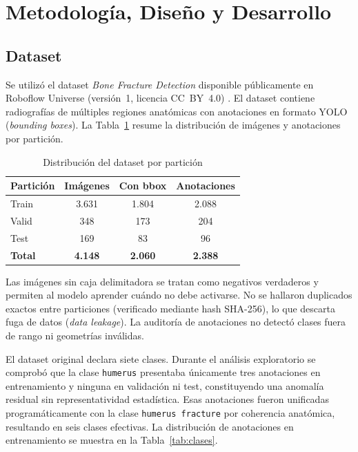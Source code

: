 \documentclass[conference]{IEEEtran}
\begin{document}
\section{Metodología, Diseño y Desarrollo}

\subsection{Dataset}

Se utilizó el dataset \textit{Bone Fracture Detection} disponible públicamente en
Roboflow Universe (versión~1, licencia CC~BY~4.0) \cite{b5}. El dataset contiene
radiografías de múltiples regiones anatómicas con anotaciones en formato YOLO
(\textit{bounding boxes}). La Tabla~\ref{tab:dataset} resume la distribución de
imágenes y anotaciones por partición.

\begin{table}[htbp]
\caption{Distribución del dataset por partición}
\label{tab:dataset}
\begin{center}
\begin{tabular}{lccc}
\toprule
\textbf{Partición} & \textbf{Imágenes} & \textbf{Con bbox} & \textbf{Anotaciones} \\
\midrule
Train & 3.631 & 1.804 & 2.088 \\
Valid & 348   & 173   & 204   \\
Test  & 169   & 83    & 96    \\
\midrule
\textbf{Total} & \textbf{4.148} & \textbf{2.060} & \textbf{2.388} \\
\bottomrule
\end{tabular}
\end{center}
\end{table}

Las imágenes sin caja delimitadora se tratan como negativos verdaderos y permiten
al modelo aprender cuándo no debe activarse. No se hallaron duplicados exactos entre
particiones (verificado mediante hash SHA-256), lo que descarta fuga de datos
(\textit{data leakage}). La auditoría de anotaciones no detectó clases fuera de
rango ni geometrías inválidas.

El dataset original declara siete clases. Durante el análisis exploratorio se
comprobó que la clase \texttt{humerus} presentaba únicamente tres anotaciones en
entrenamiento y ninguna en validación ni test, constituyendo una anomalía residual
sin representatividad estadística. Esas anotaciones fueron unificadas
programáticamente con la clase \texttt{humerus fracture} por coherencia anatómica,
resultando en seis clases efectivas. La distribución de anotaciones en entrenamiento
se muestra en la Tabla~\ref{tab:clases}.
\end{document}
